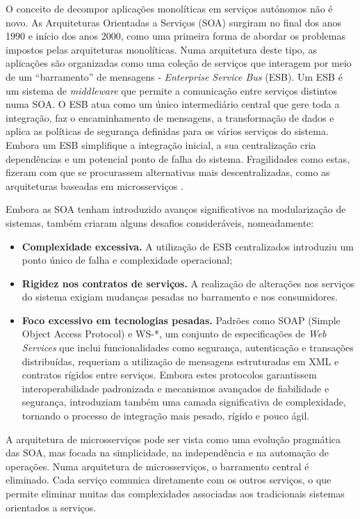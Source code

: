 O conceito de decompor aplicações monolíticas em serviços autónomos não é novo. As Arquiteturas Orientadas a Serviços (SOA) surgiram no final dos anos 1990 e início dos anos 2000, como uma primeira forma de abordar os problemas impostos pelas arquiteturas monolíticas. Numa arquitetura deste tipo, as aplicações são organizadas como uma coleção de serviços que interagem por meio de um “barramento” de mensagens - \textit{Enterprise Service Bus} (ESB). Um ESB é um sistema de \textit{middleware} que permite a comunicação entre serviços distintos numa SOA. O ESB atua como um único intermediário central que gere toda a integração, faz o encaminhamento de mensagens, a transformação de dados e aplica as políticas de segurança definidas para os vários serviços do sistema. Embora um ESB simplifique a integração inicial, a sua centralização cria dependências e um potencial ponto de falha do sistema. Fragilidades como estas, fizeram com que se procurassem alternativas mais descentralizadas, como as arquiteturas baseadas em microsserviços \cite{Aziz2020}.



Embora as SOA tenham introduzido avanços significativos na modularização de sistemas, também criaram alguns desafios consideráveis, nomeadamente:


\begin{itemize}
    \item \textbf{Complexidade excessiva.} A utilização de ESB centralizados introduziu um ponto único de falha e complexidade operacional;
    \item \textbf{Rigidez nos contratos de serviços.} A realização de alterações nos serviços do sistema exigiam mudanças pesadas no barramento e nos consumidores.
    \item \textbf{Foco excessivo em tecnologias pesadas.} Padrões como SOAP (Simple Object Access Protocol) e WS-*, um conjunto de especificações de \textit{Web Services} que inclui funcionalidades como segurança, autenticação e transações distribuídas, requeriam a utilização de mensagens estruturadas em XML e contratos rígidos entre serviços. Embora estes protocolos garantissem interoperabilidade padronizada e mecanismos avançados de fiabilidade e segurança, introduziam também uma camada significativa de complexidade, tornando o processo de integração mais pesado, rígido e pouco ágil.

\end{itemize}

A arquitetura de microsserviços pode ser vista como uma evolução pragmática das SOA, mas focada na simplicidade, na independência e na automação de operações. Numa arquitetura de microsserviços, o barramento central é eliminado. Cada serviço comunica diretamente com os outros serviços, o que permite eliminar muitas das complexidades associadas aos tradicionais sistemas orientados a serviços.

